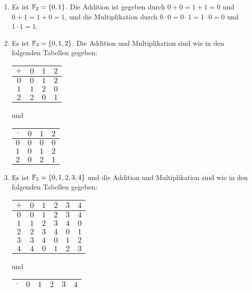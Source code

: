 \begin{bsp}
 \begin{enumerate}[leftmargin=*]
  \item
   Es ist $\mathbb{F}_2 = \{0, 1\}$. Die Addition ist gegeben durch $0 + 0 = 1 + 1 = 0$ und $0 + 1 = 1 + 0 = 1$, und die Multiplikation durch $0 \cdot 0 = 0 \cdot 1 = 1 \cdot 0 = 0$ und $1 \cdot 1 = 1$.
  \item
   Es ist $\mathbb{F}_3 = \{0, 1, 2\}$. Die Addition und Multiplikation sind wie in den folgenden Tabellen gegeben:
   \begin{center}
    \begin{tabular}{|c|c|c|c|}
     \hline
     $+$ & $0$ & $1$ & $2$ \\\hline
     $0$ & $0$ & $1$ & $2$ \\\hline
     $1$ & $1$ & $2$ & $0$ \\\hline
     $2$ & $2$ & $0$ & $1$ \\\hline
    \end{tabular}
    \quad und \quad
    \begin{tabular}{|c|c|c|c|}
     \hline
     $\cdot$ & $0$ & $1$ & $2$ \\\hline
     $0$     & $0$ & $0$ & $0$ \\\hline
     $1$     & $0$ & $1$ & $2$ \\\hline
     $2$     & $0$ & $2$ & $1$ \\\hline
    \end{tabular}
   \end{center}
  \item
   Es ist $\mathbb{F}_5 = \{0, 1, 2, 3, 4\}$ und die Addition und Multiplikation sind wie in den folgenden Tabellen gegeben:
   \begin{center}
    \begin{tabular}{|c|c|c|c|c|c|}
     \hline
     $+$ & $0$ & $1$ & $2$ & $3$ & $4$ \\\hline
     $0$ & $0$ & $1$ & $2$ & $3$ & $4$ \\\hline
     $1$ & $1$ & $2$ & $3$ & $4$ & $0$ \\\hline
     $2$ & $2$ & $3$ & $4$ & $0$ & $1$ \\\hline
     $3$ & $3$ & $4$ & $0$ & $1$ & $2$ \\\hline
     $4$ & $4$ & $0$ & $1$ & $2$ & $3$ \\\hline
    \end{tabular}
    \quad und \quad
    \begin{tabular}{|c|c|c|c|c|c|}
     \hline
     $\cdot$ & $0$ & $1$ & $2$ & $3$ & $4$ \\\hline

\end{tabular}
\end{center}
\end{enumerate}
\end{bsp}

